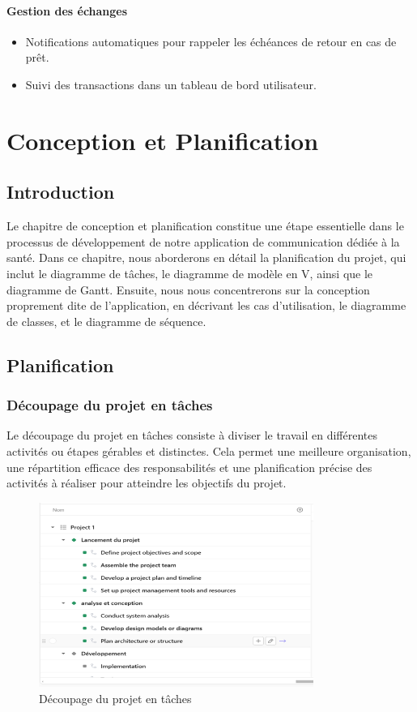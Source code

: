 \documentclass[12pt,a4paper]{report}
\begin{document}
	\subsubsection{Gestion des échanges}
	\begin{itemize}
		\item Notifications automatiques pour rappeler les échéances de retour en cas de prêt.
		\item Suivi des transactions dans un tableau de bord utilisateur.
	\end{itemize}
	
	
	\chapter{Conception et Planification}
	
	\newpage
	
	\section{Introduction}
	Le chapitre de conception et planification constitue une étape essentielle dans le processus de développement de notre application de communication dédiée à la santé. Dans ce chapitre, nous aborderons en détail la planification du projet, qui inclut le diagramme de tâches, le diagramme de modèle en V, ainsi que le diagramme de Gantt. Ensuite, nous nous concentrerons sur la conception proprement dite de l'application, en décrivant les cas d'utilisation, le diagramme de classes, et le diagramme de séquence.
	
	\section{Planification}
	\subsection{Découpage du projet en tâches}
	Le découpage du projet en tâches consiste à diviser le travail en différentes activités ou étapes gérables et distinctes. Cela permet une meilleure organisation, une répartition efficace des responsabilités et une planification précise des activités à réaliser pour atteindre les objectifs du projet.
	
	\begin{figure}[H]
		\centering
		\includegraphics[width=0.8\textwidth]{images/taches_projet.png}
		\caption{Découpage du projet en tâches}
		\label{fig:decoupage}
	\end{figure}
	
\end{document}
